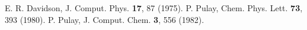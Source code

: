  E. R. Davidson, J. Comput. Phys. \textbf{17}, 87 (1975).
 P. Pulay, Chem. Phys. Lett. \textbf{73}, 393 (1980).
 P. Pulay, J. Comput. Chem. \textbf{3}, 556 (1982).
